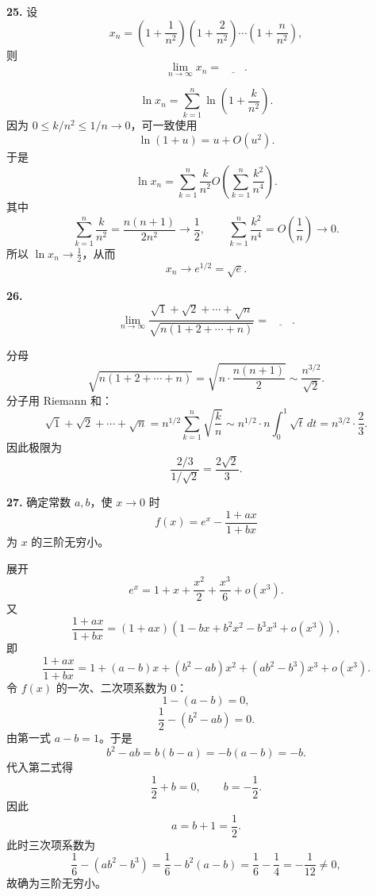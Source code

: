 \begin{problemblock}
\textbf{25.} 设
\[
x_n=\left(1+\frac1{n^2}\right)
\left(1+\frac2{n^2}\right)\cdots
\left(1+\frac n{n^2}\right),
\]
则
\[
\lim_{n\to\infty}x_n=\underline{\qquad}.
\]
\end{problemblock}

\begin{solutionblock}
\[
\ln x_n=\sum_{k=1}^n\ln\left(1+\frac{k}{n^2}\right).
\]
因为 \(0\le k/n^2\le1/n\to0\)，可一致使用
\[
\ln(1+u)=u+O(u^2).
\]
于是
\[
\ln x_n
=\sum_{k=1}^n\frac{k}{n^2}
O\left(\sum_{k=1}^n\frac{k^2}{n^4}\right).
\]
其中
\[
\sum_{k=1}^n\frac{k}{n^2}
=\frac{n(n+1)}{2n^2}\to\frac12,
\qquad
\sum_{k=1}^n\frac{k^2}{n^4}=O\left(\frac1n\right)\to0.
\]
所以 \(\ln x_n\to\frac12\)，从而
\[
x_n\to e^{1/2}=\sqrt e.
\]
\end{solutionblock}

\begin{problemblock}
\textbf{26.}
\[
\lim_{n\to\infty}
\frac{\sqrt1+\sqrt2+\cdots+\sqrt n}
{\sqrt{n(1+2+\cdots+n)}}
=\underline{\qquad}.
\]
\end{problemblock}

\begin{solutionblock}
分母
\[
\sqrt{n(1+2+\cdots+n)}
=\sqrt{n\cdot\frac{n(n+1)}2}
\sim\frac{n^{3/2}}{\sqrt2}.
\]
分子用 Riemann 和：
\[
\sqrt1+\sqrt2+\cdots+\sqrt n
=n^{1/2}\sum_{k=1}^n\sqrt{\frac{k}{n}}
\sim n^{1/2}\cdot n\int_0^1\sqrt t\,dt
=n^{3/2}\cdot\frac23.
\]
因此极限为
\[
\frac{2/3}{1/\sqrt2}
=\frac{2\sqrt2}{3}.
\]
\end{solutionblock}

\begin{problemblock}
\textbf{27.} 确定常数 \(a,b\)，使 \(x\to0\) 时
\[
f(x)=e^x-\frac{1+ax}{1+bx}
\]
为 \(x\) 的三阶无穷小。
\end{problemblock}

\begin{solutionblock}
展开
\[
e^x=1+x+\frac{x^2}{2}+\frac{x^3}{6}+o(x^3).
\]
又
\[
\frac{1+ax}{1+bx}
=(1+ax)(1-bx+b^2x^2-b^3x^3+o(x^3)),
\]
即
\[
\frac{1+ax}{1+bx}
=1+(a-b)x+(b^2-ab)x^2+(ab^2-b^3)x^3+o(x^3).
\]
令 \(f(x)\) 的一次、二次项系数为 0：
\[
1-(a-b)=0,
\]
\[
\frac12-(b^2-ab)=0.
\]
由第一式 \(a-b=1\)。于是
\[
b^2-ab=b(b-a)=-b(a-b)=-b.
\]
代入第二式得
\[
\frac12+b=0,\qquad b=-\frac12.
\]
因此
\[
a=b+1=\frac12.
\]
此时三次项系数为
\[
\frac16-(ab^2-b^3)
=\frac16-b^2(a-b)
=\frac16-\frac14
=-\frac1{12}\ne0,
\]
故确为三阶无穷小。

\end{solutionblock}

